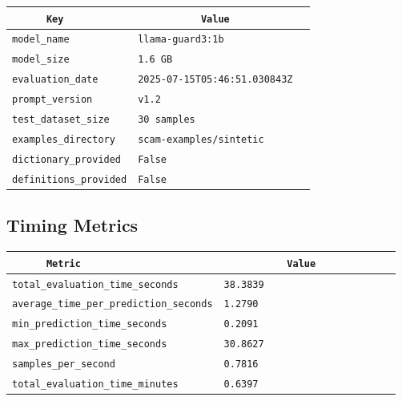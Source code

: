 \documentclass{article}
\begin{document}
\begin{center}
\begin{tabular}{l | l} \hline
    \verb|      Key      | & \verb|           Value           | \\ \hline
    \hline
    \verb|model_name    | & \verb|llama-guard3:1b              | \\ \hline
    \verb|model_size    | & \verb|1.6 GB                       | \\ \hline
    \verb|evaluation_date| & \verb|2025-07-15T05:46:51.030843Z  | \\ \hline
    \verb|prompt_version| & \verb|v1.2                         | \\ \hline
    \verb|test_dataset_size| & \verb|30 samples                   | \\ \hline
    \verb|examples_directory| & \verb|scam-examples/sintetic       | \\ \hline
    \verb|dictionary_provided| & \verb|False                        | \\ \hline
    \verb|definitions_provided| & \verb|False                        | \\ \hline
\end{tabular}
\end{center}

\subsection{Timing Metrics}

\begin{center}
\begin{tabular}{l | l} \hline
    \verb|      Metric     | & \verb|           Value           | \\ \hline
    \hline
    \verb|total_evaluation_time_seconds| & \verb|38.3839                      | \\ \hline
    \verb|average_time_per_prediction_seconds| & \verb|1.2790                       | \\ \hline
    \verb|min_prediction_time_seconds| & \verb|0.2091                       | \\ \hline
    \verb|max_prediction_time_seconds| & \verb|30.8627                      | \\ \hline
    \verb|samples_per_second| & \verb|0.7816                       | \\ \hline
    \verb|total_evaluation_time_minutes| & \verb|0.6397                       | \\ \hline
\end{tabular}
\end{center}
\end{document}
